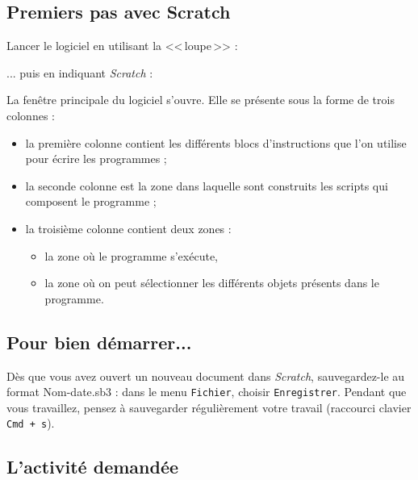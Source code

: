 \subsection{Premiers pas avec Scratch}

Lancer le logiciel en utilisant la <<\,loupe\,>> :


... puis en indiquant \emph{Scratch} :



La fenêtre principale du logiciel s'ouvre. Elle se présente sous la forme de trois colonnes :

\begin{itemize}
\item la première colonne contient les différents blocs d'instructions que l'on utilise pour écrire les programmes ;
\item la seconde colonne est la zone dans laquelle sont construits les scripts qui composent le programme ;
\item la troisième colonne contient deux zones :
        \begin{itemize}
        \item la zone où le programme s'exécute,
        \item la zone où on peut sélectionner les différents objets présents dans le programme.
        \end{itemize}
\end{itemize}




%
%
%
%


\subsection{Pour bien démarrer...}

Dès que vous avez ouvert un nouveau document dans \emph{Scratch}, sauvegardez-le au format Nom-date.sb3 : dans le menu \texttt{Fichier}, choisir \texttt{Enregistrer}. Pendant que vous travaillez, pensez à sauvegarder régulièrement votre travail (raccourci clavier \texttt{Cmd + s}).   



\subsection{L'activité demandée}


